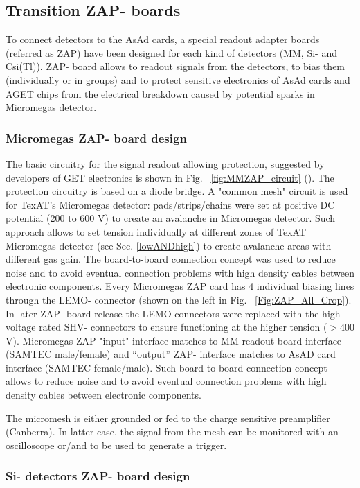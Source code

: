 \documentclass[final,number,sort&compress,5p,times,twocolumn]{elsarticle}
\begin{document}
\subsection{Transition ZAP- boards}

To connect detectors  to the AsAd cards, a special readout  adapter  boards (referred as ZAP) have been designed for each kind of detectors (MM, Si- and  Csi(Tl)). ZAP- board allows to readout signals from the detectors, to bias them (individually or in groups) and  to protect sensitive electronics of AsAd cards and AGET chips from the electrical  breakdown caused by potential sparks in Micromegas detector. 

\subsubsection{Micromegas ZAP- board design}
The  basic circuitry for the signal readout allowing protection, suggested by developers of GET electronics is shown in Fig. ~\ref{fig:MMZAP_circuit} (\cite{GET}). The protection circuitry is based on a diode bridge. A "common mesh" circuit  is used for TexAT's  Micromegas detector: pads/strips/chains were set at positive DC potential  (200 to 600 V) to create an avalanche in Micromegas detector. Such approach allows to set tension individually at different zones of TexAT Micromegas detector (see Sec. \ref{lowANDhigh}) to create avalanche areas with different gas gain. The board-to-board connection concept was used to reduce noise and to avoid eventual connection problems with high density cables between electronic components. Every Micromegas ZAP card has 4 individual biasing lines through the LEMO- connector (shown on the left in Fig. ~\ref{Fig:ZAP_All_Crop}). In later ZAP- board release the LEMO connectors were replaced with the high voltage rated SHV- connectors to ensure functioning at the higher tension ($>400$ V). Micromegas ZAP "input" interface matches to MM readout board interface (SAMTEC male/female) and ``output'' ZAP- interface matches to AsAD card interface (SAMTEC female/male). Such board-to-board connection concept allows to reduce noise and to avoid eventual connection problems with high density cables between electronic components.

The micromesh is either grounded or fed to the charge sensitive preamplifier (Canberra). In latter case, the signal from the mesh can be monitored with an oscilloscope or/and to be used to generate a trigger.

\subsubsection{Si- detectors ZAP- board design}
\end{document}
